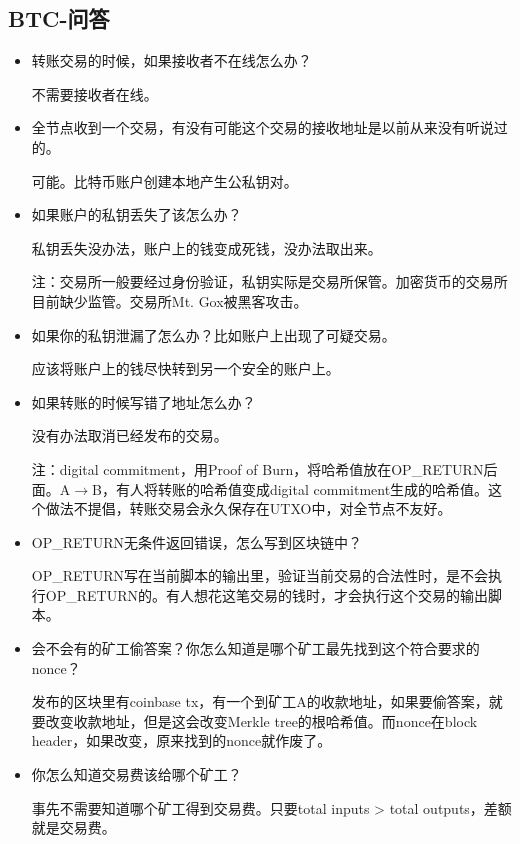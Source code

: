 \documentclass[10pt]{ctexart}
\begin{document}
\subsection{BTC-问答}
\begin{itemize}
    \item 转账交易的时候，如果接收者不在线怎么办？
        
    不需要接收者在线。
    \item 全节点收到一个交易，有没有可能这个交易的接收地址是以前从来没有听说过的。
    
    可能。比特币账户创建本地产生公私钥对。
    \item 如果账户的私钥丢失了该怎么办？
    
    私钥丢失没办法，账户上的钱变成死钱，没办法取出来。

    注：交易所一般要经过身份验证，私钥实际是交易所保管。加密货币的交易所目前缺少监管。交易所Mt. Gox被黑客攻击。
    \item 如果你的私钥泄漏了怎么办？比如账户上出现了可疑交易。
    
    应该将账户上的钱尽快转到另一个安全的账户上。

    \item 如果转账的时候写错了地址怎么办？
    
    没有办法取消已经发布的交易。

    注：digital commitment，用Proof of Burn，将哈希值放在OP\_RETURN后面。A$\rightarrow$B，有人将转账的哈希值变成digital commitment生成的哈希值。这个做法不提倡，转账交易会永久保存在UTXO中，对全节点不友好。

    \item OP\_RETURN无条件返回错误，怎么写到区块链中？
    
    OP\_RETURN写在当前脚本的输出里，验证当前交易的合法性时，是不会执行OP\_RETURN的。有人想花这笔交易的钱时，才会执行这个交易的输出脚本。

    \item 会不会有的矿工偷答案？你怎么知道是哪个矿工最先找到这个符合要求的nonce？
    
    发布的区块里有coinbase tx，有一个到矿工A的收款地址，如果要偷答案，就要改变收款地址，但是这会改变Merkle tree的根哈希值。而nonce在block header，如果改变，原来找到的nonce就作废了。

    \item 你怎么知道交易费该给哪个矿工？
    
    事先不需要知道哪个矿工得到交易费。只要total inputs > total outputs，差额就是交易费。
\end{itemize}
 
\end{document}
